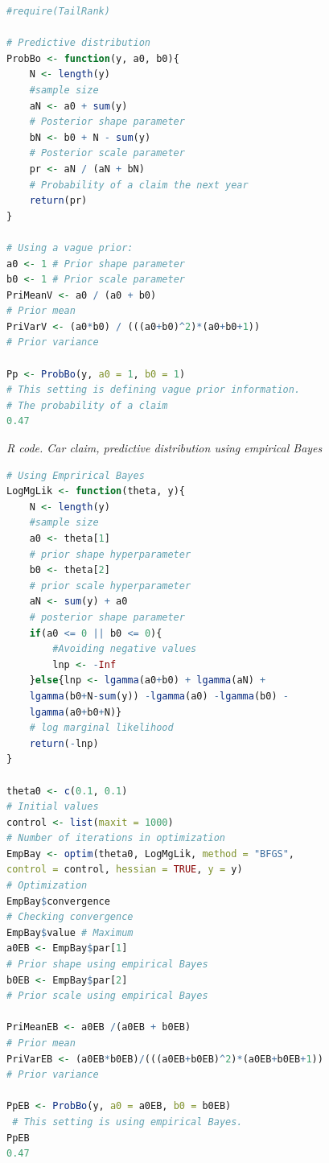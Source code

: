 \begin{enumerate}[leftmargin=*]
\begin{tcolorbox}[enhanced,width=4.67in,center upper,
	fontupper=\large\bfseries,drop shadow southwest,sharp corners]
\begin{VF}
\begin{lstlisting}[basicstyle=\footnotesize, language=R]
#require(TailRank)

# Predictive distribution
ProbBo <- function(y, a0, b0){
	N <- length(y) 
	#sample size
	aN <- a0 + sum(y) 
	# Posterior shape parameter
	bN <- b0 + N - sum(y) 
	# Posterior scale parameter
	pr <- aN / (aN + bN) 
	# Probability of a claim the next year
	return(pr)
} 

# Using a vague prior:
a0 <- 1 # Prior shape parameter
b0 <- 1 # Prior scale parameter
PriMeanV <- a0 / (a0 + b0) 
# Prior mean
PriVarV <- (a0*b0) / (((a0+b0)^2)*(a0+b0+1)) 
# Prior variance

Pp <- ProbBo(y, a0 = 1, b0 = 1)
# This setting is defining vague prior information.
# The probability of a claim 
0.47

\end{lstlisting}
\end{VF}
\end{tcolorbox}


\begin{tcolorbox}[enhanced,width=4.67in,center upper,
	fontupper=\large\bfseries,drop shadow southwest,sharp corners]
	\textit{R code. Car claim, predictive distribution using empirical Bayes}
\begin{VF}
\begin{lstlisting}[basicstyle=\footnotesize, language=R]
# Using Emprirical Bayes
LogMgLik <- function(theta, y){
	N <- length(y) 
	#sample size
	a0 <- theta[1] 
	# prior shape hyperparameter
	b0 <- theta[2] 
	# prior scale hyperparameter
	aN <- sum(y) + a0 
	# posterior shape parameter
	if(a0 <= 0 || b0 <= 0){ 
		#Avoiding negative values
		lnp <- -Inf
	}else{lnp <- lgamma(a0+b0) + lgamma(aN) + 
	lgamma(b0+N-sum(y)) -lgamma(a0) -lgamma(b0) - 
	lgamma(a0+b0+N)} 
	# log marginal likelihood
	return(-lnp)
}

theta0 <- c(0.1, 0.1) 
# Initial values
control <- list(maxit = 1000) 
# Number of iterations in optimization
EmpBay <- optim(theta0, LogMgLik, method = "BFGS", 
control = control, hessian = TRUE, y = y) 
# Optimization
EmpBay$convergence 
# Checking convergence
EmpBay$value # Maximum
a0EB <- EmpBay$par[1] 
# Prior shape using empirical Bayes
b0EB <- EmpBay$par[2] 
# Prior scale using empirical Bayes

PriMeanEB <- a0EB /(a0EB + b0EB)  
# Prior mean
PriVarEB <- (a0EB*b0EB)/(((a0EB+b0EB)^2)*(a0EB+b0EB+1)) 
# Prior variance

PpEB <- ProbBo(y, a0 = a0EB, b0 = b0EB)
 # This setting is using empirical Bayes.
PpEB
0.47

\end{lstlisting}
\end{VF}
\end{tcolorbox}



\end{enumerate}
